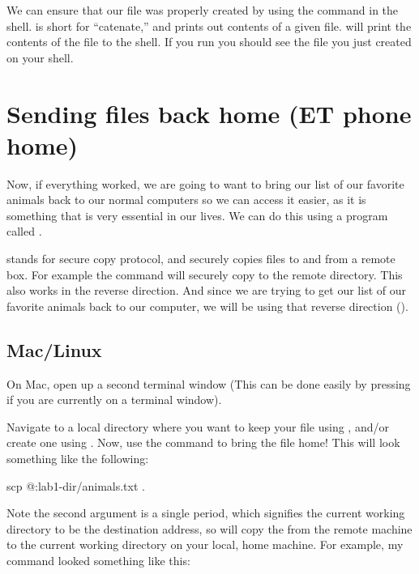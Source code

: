\documentclass{tufte-handout}
\begin{document}
We can ensure that our file was properly created by using the
 command in the shell.  is short for
``catenate,'' and prints out contents of a given file.   will print the contents of the file to the shell. If
you run  you should see the file you just
created on your shell.

\section{Sending files back home (ET phone home)}

Now, if everything worked, we are going to want to bring our list of our
favorite animals back to our normal computers so we can access it
easier, as it is something that is very essential in our lives.  We can
do this using a program called .

 stands for secure copy protocol, and securely copies
files to and from a remote box.  For example the command  will securely copy
 to the remote directory. This also works in the
reverse direction.  And since we are trying to get our list of our
favorite animals back to our computer, we will be using that reverse
direction ().

\subsection{Mac/Linux}

On Mac, open up a second terminal window (This can be done easily by
pressing  if you are currently on a terminal window).

Navigate to a local directory where you want to keep your
 file using , and/or create one using
.  Now, use the  command to bring
the file home!  This will look something like the following:

\begin{CmdLine}
  \prompt scp @:lab1-dir/animals.txt .
\end{CmdLine}

\noindent
Note the second argument is a single period, which signifies the current
working directory to be the destination address, so  will copy the
 from the remote machine to the current working
directory on your local, home machine. For example, my  command
looked something like this:
\end{document}
